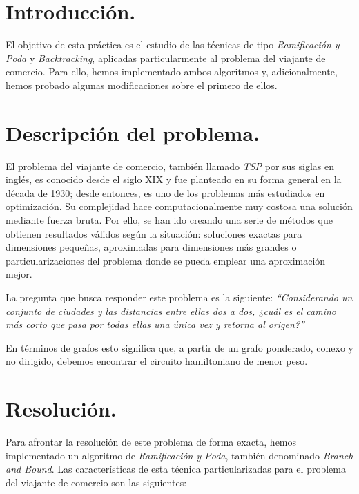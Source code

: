 \documentclass[11pt,a4paper]{article}
\begin{document}
	\section{Introducción.}

		\par
		El objetivo de esta práctica es el estudio de las técnicas de tipo \textit{Ramificación y Poda} y \textit{Backtracking}, aplicadas particularmente al problema del viajante de comercio. Para ello, hemos implementado ambos algoritmos y, adicionalmente, hemos probado algunas modificaciones sobre el primero de ellos.

	\section{Descripción del problema.}

		\par
		El problema del viajante de comercio, también llamado \textit{TSP} por sus siglas en inglés, es conocido desde el siglo XIX y fue planteado en su forma general en la década de 1930; desde entonces, es uno de los problemas más estudiados en optimización. Su complejidad hace computacionalmente muy costosa una solución mediante fuerza bruta. Por ello, se han ido creando una serie de métodos que obtienen resultados válidos según la situación: soluciones exactas para dimensiones pequeñas, aproximadas para dimensiones más grandes o particularizaciones del problema donde se pueda emplear una aproximación mejor.

		\par
		La pregunta que busca responder este problema es la siguiente: \textit{``Considerando un conjunto de ciudades y las distancias entre ellas dos a dos, ¿cuál es el camino más corto que pasa por todas ellas una única vez y retorna al origen?''}

		\par
		En términos de grafos esto significa que, a partir de un grafo ponderado, conexo y no dirigido, debemos encontrar el circuito hamiltoniano de menor peso.

	\section{Resolución.}

		\par
		Para afrontar la resolución de este problema de forma exacta, hemos implementado un algoritmo de \textit{Ramificación y Poda}, también denominado \textit{Branch and Bound}. Las características de esta técnica particularizadas para el problema del viajante de comercio son las siguientes:
\end{document}
